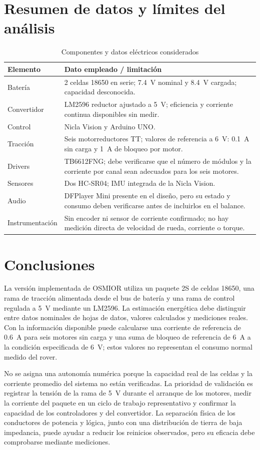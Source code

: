 \documentclass[conference]{IEEEtran}
\begin{document}
\section{Resumen de datos y límites del análisis}
\begin{table}[!t]
\caption{Componentes y datos eléctricos considerados}
\label{tab:components}
\centering
\footnotesize
\begin{tabular}{p{} p{}}
\toprule
\textbf{Elemento} & \textbf{Dato empleado / limitación}\\
\midrule
Batería & 2 celdas 18650 en serie; \SI{7.4}{V} nominal y \SI{8.4}{V} cargada; capacidad desconocida.\\
Convertidor & LM2596 reductor ajustado a \SI{5}{V}; eficiencia y corriente continua disponibles sin medir.\\
Control & Nicla Vision y Arduino UNO.\\
Tracción & Seis motorreductores TT; valores de referencia a \SI{6}{V}: \SI{0.1}{A} sin carga y \SI{1}{A} de bloqueo por motor.\\
Drivers & TB6612FNG; debe verificarse que el número de módulos y la corriente por canal sean adecuados para los seis motores.\\
Sensores & Dos HC-SR04; IMU integrada de la Nicla Vision.\\
Audio & DFPlayer Mini presente en el diseño, pero su estado y consumo deben verificarse antes de incluirlos en el balance.\\
Instrumentación & Sin encoder ni sensor de corriente confirmado; no hay medición directa de velocidad de rueda, corriente o torque.\\
\bottomrule
\end{tabular}
\end{table}

\section{Conclusiones}
La versión implementada de OSMIOR utiliza un paquete 2S de celdas 18650, una rama de tracción alimentada desde el bus de batería y una rama de control regulada a \SI{5}{V} mediante un LM2596. La estimación energética debe distinguir entre datos nominales de hojas de datos, valores calculados y mediciones reales. Con la información disponible puede calcularse una corriente de referencia de \SI{0.6}{A} para seis motores sin carga y una suma de bloqueo de referencia de \SI{6}{A} a la condición especificada de \SI{6}{V}; estos valores no representan el consumo normal medido del rover.

No se asigna una autonomía numérica porque la capacidad real de las celdas y la corriente promedio del sistema no están verificadas. La prioridad de validación es registrar la tensión de la rama de \SI{5}{V} durante el arranque de los motores, medir la corriente del paquete en un ciclo de trabajo representativo y confirmar la capacidad de los controladores y del convertidor. La separación física de los conductores de potencia y lógica, junto con una distribución de tierra de baja impedancia, puede ayudar a reducir los reinicios observados, pero su eficacia debe comprobarse mediante mediciones.
\end{document}
